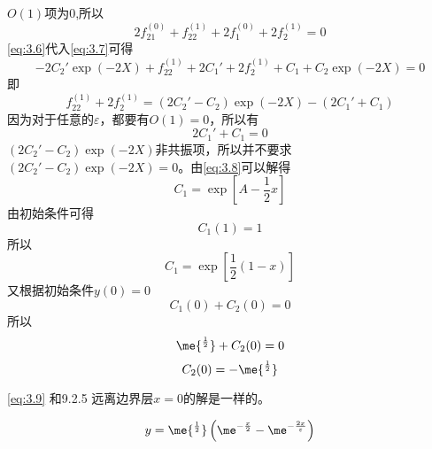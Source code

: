 \documentclass[12pt]{article}
\begin{document}
\subsection{}
$O(1)$项为$0$,所以
\begin{equation}
	2f^{(0)}_{21} + f^{(1)}_{22} + 2f^{(0)}_1 + 2f^{(1)}_2 = 0
	\label{eq:3.7}
\end{equation}
\cref{eq:3.6}代入\cref{eq:3.7}可得
\begin{equation}
	-2C_2'\exp{(-2X)} + f^{(1)}_{22} + 2C_1' + 2f^{(1)}_2 + C_1 + C_2 \exp{(-2X)}= 0
\end{equation}
即
\begin{equation}
	f^{(1)}_{22} + 2f^{(1)}_2 = (2C_2' - C_2)\exp{(-2X)} - (2C_1' + C_1)
\end{equation}
因为对于任意的$\varepsilon$，都要有$O(1)=0$，所以有
\begin{equation}
	2C_1' + C_1 = 0
	\label{eq:3.8}
\end{equation}
$(2C_2' - C_2)\exp{(-2X)}$非共振项，所以并不要求$(2C_2' - C_2)\exp{(-2X)} = 0$。由\cref{eq:3.8}可以解得
\begin{equation}
	C_1 = \exp{\left[A - \frac{1}{2}x\right]}
	\label{eq:3.9}
\end{equation}
由初始条件可得
\begin{equation}
	C_1(1) = 1
\end{equation}
所以
\begin{equation}
	C_1 = \exp{\left[\frac{1}{2}(1 - x)\right]}
\end{equation}
又根据初始条件$y(0) = 0$
\begin{equation}
	C_1(0) + C_2(0) = 0
\end{equation}
所以
\begin{equation}
	\me{^\frac{1}{2}} + C_2(0) = 0
\end{equation}
\begin{equation}
	C_2(0) = - \me{^\frac{1}{2}} 
\end{equation}

\cref{eq:3.9} 和9.2.5 远离边界层$x=0$的解是一样的。

\begin{equation}
	y = \me{^\frac{1}{2}} \left(\me^{-\frac{x}{2}} -\me^{-\frac{2x}{\varepsilon}} \right)
\end{equation}

\subsection{}
\end{document}

